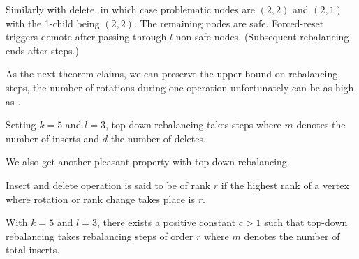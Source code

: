 Similarly with delete, in which case problematic nodes are $(2,2)$ and $(2,1)$ with the 1-child being $(2,2)$. The remaining nodes are safe. Forced-reset triggers demote after passing through $l$ non-safe nodes. (Subsequent rebalancing ends after  steps.)

As the next theorem claims, we can preserve the upper bound on rebalancing steps, the number of rotations during one operation unfortunately can be as high as .

\begin{thm}
Setting $k=5$ and $l=3$, top-down rebalancing takes  steps where $m$ denotes the number of inserts and $d$ the number of deletes.
\end{thm}

We also get another pleasant property with top-down rebalancing.

\begin{defn}
Insert and delete operation is said to be of rank $r$ if the highest rank of a vertex where rotation or rank change takes place is $r$.
\end{defn}

\begin{thm}
With $k=5$ and $l=3$, there exists a positive constant $c > 1$ such that top-down rebalancing takes  rebalancing steps of order $r$ where $m$ denotes the number of total inserts.
\end{thm}
